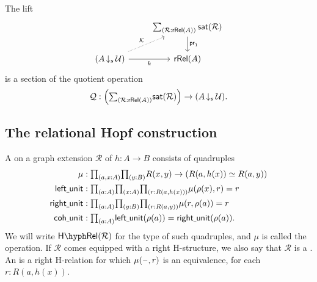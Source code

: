 \begin{cor}
The lift
\begin{equation*}
\begin{tikzcd}
& \sm{\mathcal{R}:\mathsf{rRel}(A)}\mathsf{sat}(\mathcal{R}) \arrow[d,"\proj 1"] \\
(A\,{\downarrow_s}\,\UU) \arrow[r,swap,"k"] \arrow[ur,densely dotted,"\mathcal{K}"] & \mathsf{rRel}(A)
\end{tikzcd}
\end{equation*}
is a section of the quotient operation
\begin{equation*}
\mathcal{Q} : \Big(\sm{\mathcal{R}:\mathsf{rRel}(A)}\mathsf{sat}(\mathcal{R})\Big)\to (A\,{\downarrow_s}\,\UU).
\end{equation*}
\end{cor}

\subsection{The relational Hopf construction}

\begin{defn}
A  on a graph extension $\mathcal{R}$ of $h:A\to B$ consists of quadruples
\begin{align*}
\mu & :\prd{a,x:A}{y:B} R(x,y)\to (\eqv{R(a,h(x))}{R(a,y)}) \\
\mathsf{left\usc{}unit} & : \prd{a:A}{x:A}{r:R(a,h(x))} \mu(\rho(x),r)=r \\
\mathsf{right\usc{}unit} & : \prd{a:A}{y:B}{r:R(a,y)} \mu(r,\rho(a))=r \\
\mathsf{coh\usc{}unit} & : \prd{a:A}\mathsf{left\usc{}unit}(\rho(a))=\mathsf{right\usc{}unit}(\rho(a)).
\end{align*}
We will write $\mathsf{H\hyph Rel}(\mathcal{R})$ for the type of such quadruples, and $\mu$ is called the  operation. If $\mathcal{R}$ comes equipped with a right H-structure, we also say that $\mathcal{R}$ is a . An  is a right H-relation for which $\mu(\mathord{\hspace{1pt}\text{--}\hspace{1pt}},r)$ is an equivalence, for each $r:R(a,h(x))$. 
\end{defn}

